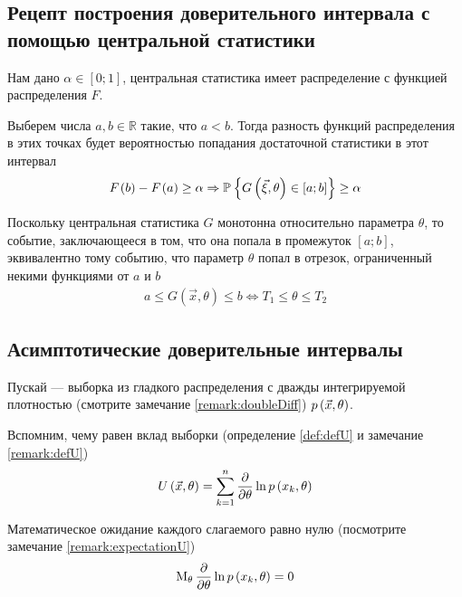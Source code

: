 \subsection{Рецепт построения доверительного интервала с помощью центральной
  статистики}

Нам дано $\alpha \in \left[ 0; 1 \right]$, центральная статистика имеет
распределение с функцией распределения $F$.

Выберем числа $a, b \in \mathbb{R}$ такие, что $a < b$. Тогда разность функций
распределения в этих точках будет вероятностью попадания достаточной статистики
в этот интервал
\begin{align*}
  F_{}\left(b\right) - F_{}\left(a\right) \ge \alpha \Rightarrow
  \mathbb{P}_{{}}\left\{ G\left( \vec{\xi}, \theta \right) \in \left[ a; b \right] \right\}
  \ge \alpha
\end{align*}

Поскольку центральная статистика $G$ монотонна относительно параметра $\theta$,
то событие, заключающееся в том, что она попала в промежуток
$\left[ a; b \right]$, эквивалентно тому событию, что параметр $\theta$ попал
в отрезок, ограниченный некими функциями от $a$ и $b$
\begin{align*}
  a \le G\left( \vec{x}, \theta \right) \le b
  \Leftrightarrow T_1 \le \theta \le T_2
\end{align*}

\subsection{Асимптотические доверительные интервалы}

Пускай \xsample --- выборка из гладкого распределения с дважды
интегрируемой плотностью (смотрите замечание \ref{remark:doubleDiff})
$p\left(\vec{x}, \theta\right)$.

Вспомним, чему равен вклад выборки (определение \ref{def:defU} и замечание
\ref{remark:defU})
\begin{align*}
  U\left( \vec{x},\theta \right)
  = \sum_{k=1}^n\frac{\partial}{\partial\theta}\ln{p\left(x_k,\theta\right)}
\end{align*}

Математическое ожидание каждого слагаемого равно нулю
(посмотрите замечание \ref{remark:expectationU})
\begin{align*}
  \operatorname{M}_{\theta} \frac{\partial}{\partial \theta} \ln{p\left(x_k, \theta\right)}
  = 0
\end{align*}

